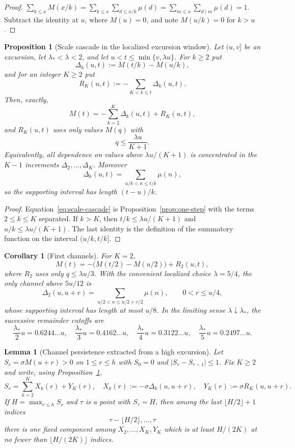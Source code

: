 \documentclass[11pt]{amsart}
\numberwithin{equation}{section}
\theoremstyle{plain}
\newtheorem{proposition}[theorem]{Proposition}
\newtheorem{lemma}[theorem]{Lemma}
\newtheorem{corollary}[theorem]{Corollary}
\theoremstyle{definition}
\theoremstyle{remark}
\begin{document}
\begin{proof}
$\sum_{k\le x}M(x/k)=\sum_{k\le x}\sum_{d\le x/k}\mu(d)
=\sum_{m\le x}\sum_{d\mid m}\mu(d)=1$. Subtract the identity at $u$, where
$M(u)=0$, and note $M(u/k)=0$ for $k>u$.
\end{proof}

\begin{proposition}[Scale cascade in the localized excursion window]
\label{prop:scale-cascade}
Let $(u,v]$ be an excursion, let $\lambda_*<\lambda<2$, and let
$u<t\le\min\{v,\lambda u\}$.  For $k\ge2$ put
\[
\Delta_k(u,t):=M(t/k)-M(u/k),
\]
and for an integer $K\ge2$ put
\[
R_K(u,t):=-\sum_{K<k\le t}\Delta_k(u,t).
\]
Then, exactly,
\begin{equation}
\label{eq:scale-cascade}
M(t)=-\sum_{k=2}^{K}\Delta_k(u,t)+R_K(u,t),
\end{equation}
and $R_K(u,t)$ uses only values $M(q)$ with
\[
q\le\frac{\lambda u}{K+1}.
\]
Equivalently, all dependence on values above $\lambda u/(K+1)$ is
concentrated in the $K-1$ increments
$\Delta_2,\ldots,\Delta_K$.  Moreover
\[
\Delta_k(u,t)=\sum_{u/k<n\le t/k}\mu(n),
\]
so the supporting interval has length $(t-u)/k$.
\end{proposition}

\begin{proof}
Equation~\eqref{eq:scale-cascade} is Proposition~\ref{prop:one-step} with
the terms $2\le k\le K$ separated.  If $k>K$, then
$t/k\le\lambda u/(K+1)$ and $u/k\le\lambda u/(K+1)$.  The last identity is
the definition of the summatory function on the interval $(u/k,t/k]$.
\end{proof}

\begin{corollary}[First channels]
\label{cor:first-channels}
For $K=2$,
\[
M(t)=-\bigl(M(t/2)-M(u/2)\bigr)+R_2(u,t),
\]
where $R_2$ uses only $q\le\lambda u/3$.  With the convenient localized
choice $\lambda=5/4$, the only channel above $5u/12$ is
\[
\Delta_2(u,u+r)=\sum_{u/2<n\le u/2+r/2}\mu(n),
\qquad 0<r\le u/4,
\]
whose supporting interval has length at most $u/8$.  In the limiting
sense $\lambda\downarrow\lambda_*$, the successive remainder cutoffs are
\[
\frac{\lambda_*}{2}u=0.6244\ldots u,\quad
\frac{\lambda_*}{3}u=0.4162\ldots u,\quad
\frac{\lambda_*}{4}u=0.3122\ldots u,\quad
\frac{\lambda_*}{5}u=0.2497\ldots u.
\]
\end{corollary}

\begin{lemma}[Channel persistence extracted from a high excursion]
\label{lem:channel-persistence}
Let $S_r=\sigma M(u+r)>0$ on $1\le r\le h$ with $S_0=0$ and
$|S_r-S_{r-1}|\le1$.  Fix $K\ge2$ and write, using
Proposition~\ref{prop:scale-cascade},
\[
S_r=\sum_{k=2}^{K}X_k(r)+Y_K(r),
\quad
X_k(r):=-\sigma\Delta_k(u,u+r),
\quad
Y_K(r):=\sigma R_K(u,u+r).
\]
If $H=\max_{r\le h}S_r$ and $\tau$ is a point with $S_\tau=H$, then among
the last $\lfloor H/2\rfloor+1$ indices
\[
\tau-\lfloor H/2\rfloor,\ldots,\tau
\]
there is one fixed component among
$X_2,\ldots,X_K,Y_K$ which is at least $H/(2K)$ at no fewer than
$\lfloor H/(2K)\rfloor$ indices.
\end{lemma}
\end{document}
